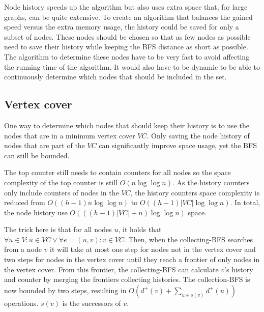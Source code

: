 Node history speeds up the algorithm but also uses extra space that, for large graphs, can be quite extensive. To create an algorithm that balances the gained speed versus the extra memory usage, the history could be saved for only a subset of nodes. These nodes should be chosen so that as few nodes as possible need to save their history while keeping the BFS distance as short as possible. The algorithm to determine these nodes have to be very fast to avoid affecting the running time of the algorithm. It would also have to be dynamic to be able to continuously determine which nodes that should be included in the set.

\subsection{Vertex cover}
\label{sec:vertex_cover}
One way to determine which nodes that should keep their history is to use the nodes that are in a minimum vertex cover $VC$. Only saving the node history of nodes that are part of the $VC$ can significantly improve space usage, yet the BFS can still be bounded.

The top counter still needs to contain counters for all nodes so the space complexity of the top counter is still $O(n\log \log n)$. As the history counters only include counters of nodes in the $VC$, the history counters space complexity is reduced from $O((h-1)n \log \log n)$ to $O((h-1)|VC| \log \log n)$. In total, the node history use $O(((h-1)|VC| + n )\log \log n)$ space.

The trick here is that for all nodes $u$, it holds that $\forall u \in V: u \in VC \vee \forall e = (u,v) : v \in VC$. Then, when the collecting-BFS searches from a node $v$ it will take at most one step for nodes not in the vertex cover and two steps for nodes in the vertex cover until they reach a frontier of only nodes in the vertex cover. From this frontier, the collecting-BFS can calculate $v$'s history and counter by merging the frontiers collecting histories. The collection-BFS is now bounded by two steps, resulting in $O(d^+(v) + \sum_{u \in s(v)}{d^+(u)})$ operations. $s(v)$ is the successors of $v$.


